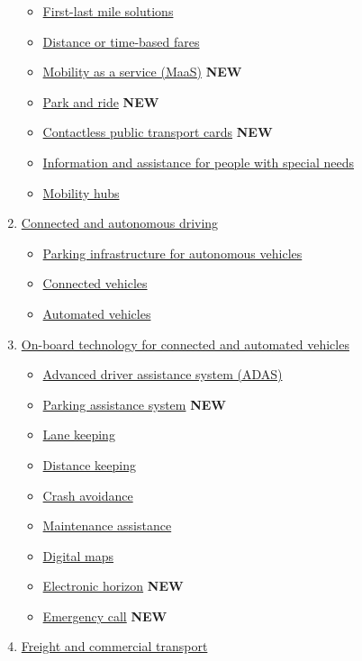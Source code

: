 \documentclass[
]{book}
\providecommand{\tightlist}{%
  \setlength{\itemsep}{0pt}\setlength{\parskip}{0pt}}
\begin{document}
\begin{enumerate}
  \begin{itemize}
  \tightlist
  \item
    \protect\hyperlink{flms}{First-last mile solutions}
  \item
    \protect\hyperlink{dist_time_fares}{Distance or time-based fares}
  \item
    \protect\hyperlink{maas}{Mobility as a service (MaaS)} \textbf{NEW}
  \item
    \protect\hyperlink{p_r}{Park and ride} \textbf{NEW}
  \item
    \protect\hyperlink{contactless_cards}{Contactless public transport cards} \textbf{NEW}
  \item
    \protect\hyperlink{special_needs}{Information and assistance for people with special needs}
  \item
    \protect\hyperlink{mobility_hubs}{Mobility hubs}
  \end{itemize}
\item
  \protect\hyperlink{connected}{Connected and autonomous driving}

  \begin{itemize}
  \tightlist
  \item
    \protect\hyperlink{parking_av}{Parking infrastructure for autonomous vehicles}
  \item
    \protect\hyperlink{connected_veh}{Connected vehicles}
  \item
    \protect\hyperlink{av}{Automated vehicles}
  \end{itemize}
\item
  \protect\hyperlink{onboard}{On-board technology for connected and automated vehicles}

  \begin{itemize}
  \tightlist
  \item
    \protect\hyperlink{adas}{Advanced driver assistance system (ADAS)}
  \item
    \protect\hyperlink{parking_assistance}{Parking assistance system} \textbf{NEW}
  \item
    \protect\hyperlink{lane_keeping}{Lane keeping}
  \item
    \protect\hyperlink{distance_keeping}{Distance keeping}
  \item
    \protect\hyperlink{crash_avoid}{Crash avoidance}
  \item
    \protect\hyperlink{maintenance_assis}{Maintenance assistance}
  \item
    \protect\hyperlink{digital_maps}{Digital maps}
  \item
    \protect\hyperlink{ehorizon}{Electronic horizon} \textbf{NEW}
  \item
    \protect\hyperlink{ecall}{Emergency call} \textbf{NEW}
  \end{itemize}
\item
  \protect\hyperlink{freight}{Freight and commercial transport}


\end{enumerate}
\end{document}
